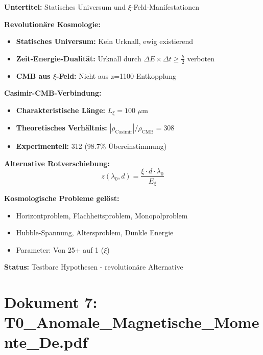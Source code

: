 \documentclass[12pt,a4paper]{article}
\newcommand{\xipar}{\xi}
\begin{document}
	\begin{documentbox}
		\textbf{Untertitel:} Statisches Universum und $\xi$-Feld-Manifestationen
		
		\textbf{Revolutionäre Kosmologie:}
		\begin{itemize}
			\item \textbf{Statisches Universum:} Kein Urknall, ewig existierend
			\item \textbf{Zeit-Energie-Dualität:} Urknall durch $\Delta E \times \Delta t \geq \frac{\hbar}{2}$ verboten
			\item \textbf{CMB aus $\xi$-Feld:} Nicht aus z=1100-Entkopplung
		\end{itemize}
		
		\textbf{Casimir-CMB-Verbindung:}
		\begin{itemize}
			\item \textbf{Charakteristische Länge:} $L_\xi = 100$ $\mu$m
			\item \textbf{Theoretisches Verhältnis:} $|\rho_{\text{Casimir}}|/\rho_{\text{CMB}} = 308$
			\item \textbf{Experimentell:} 312 (98.7\% Übereinstimmung)
		\end{itemize}
		
		\textbf{Alternative Rotverschiebung:}
		\begin{equation}
			z(\lambda_0, d) = \frac{\xipar \cdot d \cdot \lambda_0}{E_\xi}
		\end{equation}
		
		\textbf{Kosmologische Probleme gelöst:}
		\begin{itemize}
			\item Horizontproblem, Flachheitsproblem, Monopolproblem
			\item Hubble-Spannung, Altersproblem, Dunkle Energie
			\item Parameter: Von 25+ auf 1 ($\xipar$)
		\end{itemize}
		
		\textbf{Status:} Testbare Hypothesen - revolutionäre Alternative
	\end{documentbox}
	
	\section{Dokument 7: T0\_Anomale\_Magnetische\_Momente\_De.pdf}
	
\end{document}
